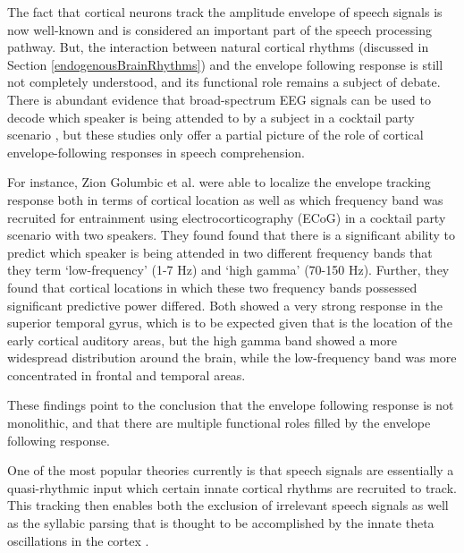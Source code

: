 \documentclass[titlepage]{article}
\begin{document}
    The fact that cortical neurons track the amplitude envelope of speech
    signals is now well-known and is considered an important part of the speech
    processing pathway. But, the interaction between natural cortical rhythms
    (discussed in Section \ref{endogenousBrainRhythms}) and the envelope following
    response is still not completely understood, and its functional role remains
    a subject of debate. There is abundant evidence that broad-spectrum EEG
    signals can be used to decode which speaker is being attended to by a
    subject in a cocktail party scenario \cite{Horton2014,DeTaillez2018}, but
    these studies only offer a partial picture of the role of cortical
    envelope-following responses in speech comprehension.

    For instance, Zion Golumbic et al. \cite{ZionGolumbic2013} were able to
    localize the envelope tracking response both in terms of cortical location
    as well as which frequency band was recruited for entrainment using
    electrocorticography (ECoG) in a cocktail party scenario with two speakers.
    They found found that there is a significant ability to predict which
    speaker is being attended in two different frequency bands that they term
    `low-frequency' (1-7 Hz) and `high gamma' (70-150 Hz). Further, they found
    that cortical locations in which these two frequency bands possessed
    significant predictive power differed. Both showed a very strong response
    in the superior temporal gyrus, which is to be expected given that is the
    location of the early cortical auditory areas, but the high gamma band
    showed a more widespread distribution around the brain, while the
    low-frequency band was more concentrated in frontal and temporal areas.

    These findings point to the conclusion that the envelope following response
    is not monolithic, and that there are multiple functional roles filled by
    the envelope following response.

    One of the most popular theories currently is that speech signals are
    essentially a quasi-rhythmic input which certain innate cortical rhythms are
    recruited to track. This tracking then enables both the exclusion of
    irrelevant speech signals \cite{Horton2014,OSullivan2015} as well as the
    syllabic parsing that is thought to be accomplished by the innate theta
    oscillations in the cortex \cite{Doelling2014,Ghitza2013b}.
\end{document}
